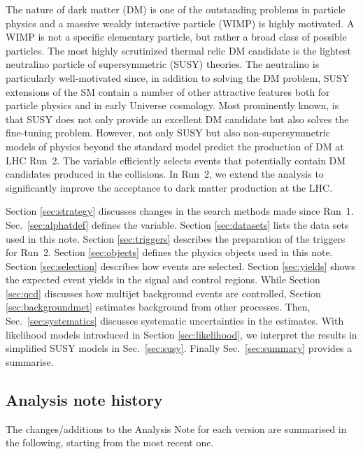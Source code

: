 The nature of dark matter (DM) is one of the outstanding problems in
particle physics and a massive weakly interactive particle (WIMP) is
highly motivated. A WIMP is not a specific elementary particle, but
rather a broad class of possible particles. The most highly
scrutinized thermal relic DM candidate is the lightest neutralino
particle of supersymmetric (SUSY) theories. The neutralino is
particularly well-motivated since, in addition to solving the DM
problem, SUSY extensions of the SM contain a number of other
attractive features both for particle physics and in early Universe
cosmology. Most prominently known, is that SUSY does not only provide
an excellent DM candidate but also solves the fine-tuning problem.
However, not only SUSY but also non-supersymmetric models of physics
beyond the standard model predict the production of DM at LHC Run~2.
The \alphat variable efficiently selects events that potentially
contain DM candidates produced in the collisions. In Run~2, we extend
the \alphat analysis to significantly improve the acceptance to dark
matter production at the LHC. 

Section \ref{sec:strategy} discusses changes in the search methods
made since Run~1. Sec.~\ref{sec:alphatdef} defines the \alphat
variable. Section \ref{sec:datasets} lists the data sets used in this
note. Section \ref{sec:triggers} describes the preparation of the
triggers for Run~2. Section \ref{sec:objects} defines the physics
objects used in this note. Section \ref{sec:selection} describes how
events are selected. Section \ref{sec:yields} shows the expected event
yields in the signal and control regions. While Section \ref{sec:qcd}
discusses how multijet background events are controlled, Section
\ref{sec:backgroundmet} estimates background from other processes.
Then, Sec.~\ref{sec:systematics} discusses systematic uncertainties in
the estimates. With likelihood models introduced in Section
\ref{sec:likelihood}, we interpret the results in simplified SUSY
models in Sec.~\ref{sec:susy}. Finally Sec.~\ref{sec:summary} provides
a summarise.


\subsection{Analysis note history}
\label{sec:an-history}
The changes/additions to the Analysis Note for each version are summarised in the following, starting from the most recent one.

